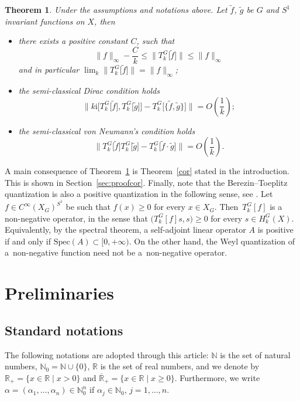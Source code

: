 \documentclass[10pt,a4paper]{amsart}
\numberwithin{equation}{section}
\newtheorem{Theorem}{Theorem}[section]
\begin{document}
	 \begin{Theorem} \label{thm:quant} Under the assumptions and notations above. Let $\widetilde{f}$, $\widetilde{g}$ be $G$ and $S^1$ invariant functions on $X$, then
	 	\begin{itemize}\itemsep=0pt
	 		\item[$(a)$] there exists a positive constant $C$, such that
	 		\[\lVert {f}\rVert_{\infty}-\frac{C}{k} \leq \big\lVert T^{G}_{k}\big[\widetilde{f}\big] \big\rVert \leq \lVert {f} \rVert_{\infty}
	 		\]
	 		and in particular $\lim_{k} \big\lVert T^{G}_{k}\big[\widetilde{f}\big] \big\rVert= \lVert {f}\rVert_{\infty}$;
	 		\item[$(b)$] the semi-classical Dirac condition holds
	 		\[ \big\lVert k\mathrm{i} \big[T^{G}_{k}\big[\widetilde{f}\big], T^{G}_{k}\big[\widetilde{g}\big]\big] -T^{G}_{k}\big[\big\{\widetilde{f}, \widetilde{g}\big\}\big]\big\rVert=O\left(\frac{1}{k}\right) ;\]
	 		\item[$(c)$] the semi-classical von Neumann's condition holds
	 		\[\big\lVert T^{G}_{k}\big[\widetilde{f}\big] T^{G}_{k}\big[\widetilde{g}\big] -T^{G}_{k}\big[\widetilde{f}\cdot \widetilde{g}\big]\big\rVert=O\left(\frac{1}{k}\right) .\]
	 	\end{itemize}
	 \end{Theorem}

 	A main consequence of Theorem~\ref{thm:quant} is Theorem~\ref{cor} stated in the introduction. This is shown in Section~\ref{sec:proofcor}.
Finally, note that the Berezin--Toeplitz quantization is also a positive quantization in the following sense, see \cite{lef}. Let $f \in C^{\infty}(X_G)^{S^1}$ be such that $f(x) \geq 0$ for every $x\in X_G$. Then~$T_k^G[f]$ is a non-negative operator, in the sense that $\bigl(T_k^G[f]s, s\bigr)\geq 0$ for every $s \in H_k^G(X)$. Equivalently, by the spectral theorem, a self-adjoint linear operator $A$ is positive if and only if ${\mathrm{Spec}(A)\subset [0, +\infty)}$.
	 On the other hand, the Weyl quantization of a~non-negative function need not be a~non-negative operator.
	
	
 	
	 \section{Preliminaries}\label{s:prelim}
	
	 \subsection{Standard notations} \label{s-ssna}
	 The following notations are adopted through this article: $\mathbb N$ is the set of natural numbers, $\mathbb N_0=\mathbb N\cup\{0\}$, $\mathbb R$ is the set of
	 real numbers, and we denote by ${\mathbb R}_+=\{x\in\mathbb R \mid x>0\}$ and $\overline{\mathbb R}_+=\{x\in\mathbb R\mid x\geq0\}$. Furthermore, we write $\alpha=(\alpha_1,\dots,\alpha_n)\in\mathbb N^n_0$
	 if $\alpha_j\in\mathbb N_0$,
	 $j=1,\dots,n$.
	
\end{document}
